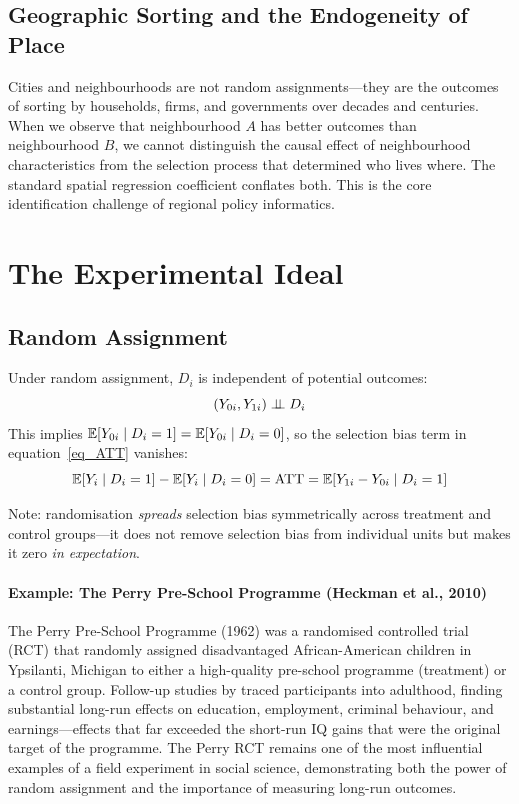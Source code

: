 \subsection{Geographic Sorting and the Endogeneity of Place}

Cities and neighbourhoods are not random assignments---they are the outcomes
of sorting by households, firms, and governments over decades and centuries.
When we observe that neighbourhood $A$ has better outcomes than neighbourhood
$B$, we cannot distinguish the causal effect of neighbourhood characteristics
from the selection process that determined who lives where. The standard
spatial regression coefficient conflates both. This is the core identification
challenge of regional policy informatics.


\section{The Experimental Ideal}
\label{sec_Experimental}

\subsection{Random Assignment}

Under random assignment, $D_i$ is independent of potential outcomes:
\begin{equation}
  (Y_{0i}, Y_{1i}) \perp\!\!\!\perp D_i
\end{equation}
This implies $\mathbb{E}[Y_{0i}\mid D_i=1] = \mathbb{E}[Y_{0i}\mid D_i=0]$, so the
selection bias term in equation~\eqref{eq_ATT} vanishes:
\begin{equation}
  \mathbb{E}[Y_i \mid D_i=1] - \mathbb{E}[Y_i \mid D_i=0] = \text{ATT}
  = \mathbb{E}[Y_{1i} - Y_{0i} \mid D_i=1]
\end{equation}

Note: randomisation \emph{spreads} selection bias symmetrically across
treatment and control groups---it does not remove selection bias from
individual units but makes it zero \emph{in expectation}.

\paragraph{Example: The Perry Pre-School Programme (Heckman et al., 2010)}

The Perry Pre-School Programme (1962) was a randomised controlled trial
(RCT) that randomly assigned disadvantaged African-American children in
Ypsilanti, Michigan to either a high-quality pre-school programme (treatment)
or a control group. Follow-up studies by \citet{Heckman2010} traced
participants into adulthood, finding substantial long-run effects on education,
employment, criminal behaviour, and earnings---effects that far exceeded the
short-run IQ gains that were the original target of the programme. The Perry
RCT remains one of the most influential examples of a field experiment in
social science, demonstrating both the power of random assignment and the
importance of measuring long-run outcomes.

